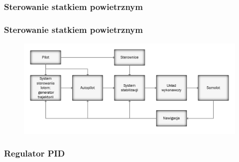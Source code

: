 \documentclass[aspectratio=169]{beamer}
\begin{document}
\begin{frame}
	\frametitle{Sterowanie statkiem powietrznym}
	\begin{figure}
	   		 \centering
	\end{figure}
\end{frame}
\begin{frame}
	\frametitle{Sterowanie statkiem powietrznym}
	\begin{figure}
	   		 \centering
	      		\includegraphics[width=\textwidth]{controller.png}
	\end{figure}
\end{frame}

\begin{frame}%
	\frametitle{Regulator PID}
	\begin{columns}
		\begin{column}{0.5\textwidth}
	   	 	\begin{figure}
	   		 \centering
	    		\end{figure}
		\end{column}
		\begin{column}{0.5\textwidth}
	   	 	\begin{figure}
	   		 \centering
	    		\end{figure}
		\end{column}
	\end{columns}
	
	
\end{frame}
\end{document}
